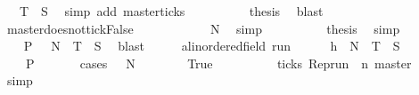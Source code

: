\begin{isabellebody}
\ {\isacartoucheopen}{\isasymrho}\ {\isasymin}\ {\isacharquery}T\ {\isasyminter}\ {\isacharquery}S{\isacartoucheclose}\ \isamarkupfalse%
\ {\isacharparenleft}simp\ add{\isacharcolon}\ master{\isacharunderscore}ticks{\isacharparenright}\isanewline
\ \ \ \ \ \ \ \ \isamarkupfalse%
\ {\isacharquery}thesis\ \isamarkupfalse%
\ blast\isanewline
\ \ \ \ \isamarkupfalse%
\isanewline
\ \ \ \ \ \ \isamarkupfalse%
\ master{\isacharunderscore}doesnot{\isacharunderscore}tick{\isacharcolon}False\isanewline
\ \ \ \ \ \ \ \ \isamarkupfalse%
\ {\isacartoucheopen}{\isasymrho}\ {\isasymin}\ {\isacharquery}N{\isacartoucheclose}\ \isamarkupfalse%
\ simp\isanewline
\ \ \ \ \ \ \ \ \isamarkupfalse%
\ {\isacharquery}thesis\ \isamarkupfalse%
\ simp\isanewline
\ \ \ \ \isamarkupfalse%
\isanewline
\ \ \isacommand{{\isacharbraceright}}\isamarkupfalse%
\ \isamarkupfalse%
\ {\isacartoucheopen}{\isacharbraceleft}{\isasymrho}{\isachardot}\ {\isacharquery}P\ {\isasymrho}{\isacharbraceright}\ {\isasymsubseteq}\ {\isacharquery}N\ {\isasymunion}\ {\isacharquery}T\ {\isasyminter}\ {\isacharquery}S{\isacartoucheclose}\ \isamarkupfalse%
\ blast\isanewline
\ \ \isacommand{{\isacharbraceleft}}\isamarkupfalse%
\ \isamarkupfalse%
\ {\isasymrho}{\isacharcolon}{\isacharcolon}{\isacartoucheopen}{\isacharparenleft}{\isacharprime}a{\isacharcolon}{\isacharcolon}linordered{\isacharunderscore}field{\isacharparenright}\ run{\isacartoucheclose}\isanewline
\ \ \ \ \isamarkupfalse%
\ h{\isacharcolon}{\isacartoucheopen}{\isasymrho}\ {\isasymin}\ {\isacharquery}N\ {\isasymunion}\ {\isacharquery}T\ {\isasyminter}\ {\isacharquery}S{\isacartoucheclose}\isanewline
\ \ \ \ \isamarkupfalse%
\ {\isacartoucheopen}{\isasymrho}\ {\isasymin}\ {\isacharbraceleft}{\isasymrho}{\isachardot}\ {\isacharquery}P\ {\isasymrho}{\isacharbraceright}{\isacartoucheclose}\isanewline
\ \ \ \ \isamarkupfalse%
\ {\isacharparenleft}cases\ {\isacartoucheopen}{\isasymrho}\ {\isasymin}\ {\isacharquery}N{\isacartoucheclose}{\isacharparenright}\isanewline
\ \ \ \ \ \ \isamarkupfalse%
\ True\isanewline
\ \ \ \ \ \ \ \ \isamarkupfalse%
\ {\isacartoucheopen}{\isasymnot}ticks\ {\isacharparenleft}Rep{\isacharunderscore}run\ {\isasymrho}\ n\ master{\isacharparenright}{\isacartoucheclose}\ \isamarkupfalse%
\ simp\isanewline
\ \ \ \ \ \ \ \ \isamarkupfalse%

\end{isabellebody}
